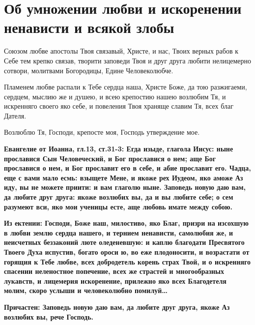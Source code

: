 \section{Об умножении любви и искоренении ненависти и всякой злобы}\begin{mymulticols}
 


Союзом любве апостолы Твоя связавый, Христе, и нас, Твоих верных рабов к Себе тем крепко связав, творити заповеди Твоя и друг друга любити нелицемерно сотвори, молитвами Богородицы, Едине Человеколюбче.


Пламенем любве распали к Тебе сердца наша, Христе Боже, да тою разжигаеми, сердцем, мыслию же и душею, и всею крепостию нашею возлюбим Тя, и искренняго своего яко себе, и повеления Твоя храняще славим Тя, всех благ Дателя.


Возлюблю Тя, Господи, крепосте моя, Господь утверждение мое.

\bfseries Евангелие от Иоанна, гл.13, ст.31-3:\normalfont{} Егда изыде, глагола Иисус: ныне прославися Сын Человеческий, и Бог прославися о нем; аще Бог прославися о нем, и Бог прославит его в себе, и абие прославит его. Чадца, еще с вами мало есмь: взыщете Мене, и якоже рех Иудеом, яко аможе Аз иду, вы не можете приити: и вам глаголю ныне. Заповедь новую даю вам, да любите друг друга: якоже возлюбих вы, да и вы любите себе; о сем разумеют вси, яко мои ученицы есте, аще любовь имате между собою.

\bfseries Из ектении:\normalfont{} Господи, Боже наш, милостиво, яко Благ, призри на изсохшую в любви землю сердца нашего, и тернием ненависти, самолюбия же, и неисчетных беззаконий люте оледеневшую: и каплю благодати Пресвятого Твоего Духа испустив, богато ороси ю, во еже плодоносити, и возрастати от горящия к Тебе любве, всех добродетель корень страх Твой, и о искренняго спасении неленостное попечение, всех же страстей и многообразных лукавств, и лицемерия искоренение, прилежно яко всех Благодетеля молим, скоро услыши и человеколюбно помилуй…

\bfseries Причастен:\normalfont{} Заповедь новую даю вам, да любите друг друга, якоже Аз возлюбих вы, рече Господь.

\end{mymulticols}

